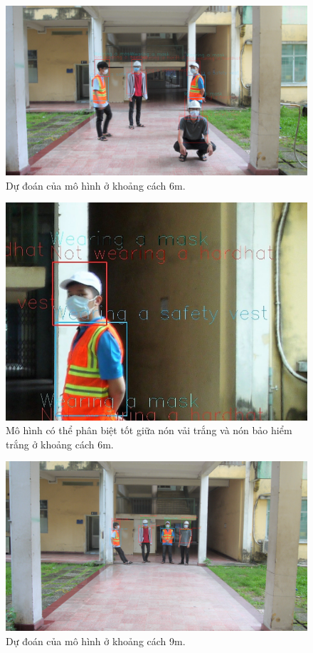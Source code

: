 \begin{figure}[ht!]
	\centerline{\includegraphics[scale=0.1]{images/good_hh_6m.jpg}}
  	\caption{Dự đoán của mô hình ở khoảng cách 6m.}
  	\label{fig:good_hh_6m}
\end{figure}
\begin{figure}[ht!]
	\centerline{\includegraphics[scale=0.4]{images/good_hh_6m_zoom.jpg}}
  	\caption{Mô hình có thể phân biệt tốt giữa nón vải trắng và nón bảo hiểm trắng ở khoảng cách 6m.}
  	\label{fig:good_hh_6m_zoom}
\end{figure}
\begin{figure}[ht!]
	\centerline{\includegraphics[scale=0.1]{images/bad_hh_9m.jpg}}
  	\caption{Dự đoán của mô hình ở khoảng cách 9m.}
  	\label{fig:good_hh_9m}
\end{figure}

